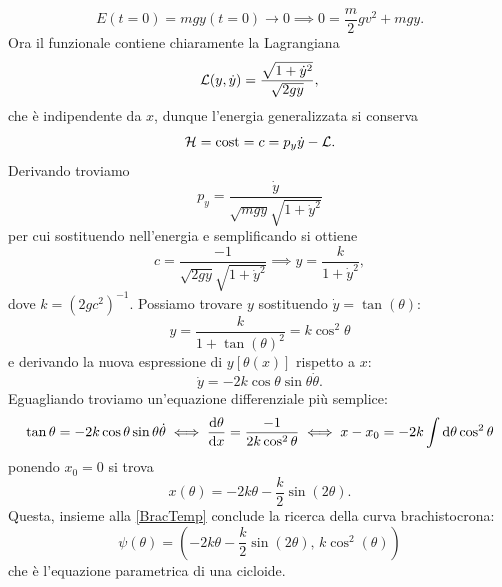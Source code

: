     \begin{equation}
        E(t=0)=mgy(t=0)\to0\implies 0=\frac{m}{2}gv^2+mgy.
    \end{equation}
    Ora il funzionale contiene chiaramente la Lagrangiana
    \begin{equation}
        \mathcal{L}(y,\dot{y}) =\frac{\sqrt{1+\dot{y}^2}}{\sqrt{2gy}} ,
    \end{equation}
    che è indipendente da $x$, dunque l'energia generalizzata si conserva
    \begin{equation}
        \mathcal{H} = \mathrm{cost}=c = p_y\dot{y} - \mathcal{L}. 
    \end{equation}
    Derivando troviamo
    \begin{equation}
        p_y = \frac{\dot{y}}{\sqrt{mgy}{\sqrt{1+\dot{y}^2}}}
    \end{equation}
    per cui sostituendo nell'energia e semplificando si ottiene
    \begin{equation}
        c = \frac{-1}{\sqrt{2gy}\sqrt{1+\dot{y}^2}} \implies y = \frac{k}{1+\dot{y}^2},
    \end{equation}
    dove $k=(2gc^2)^{-1}$. Possiamo trovare $y$ sostituendo $\dot{y}=\tan(\theta)$:
    \begin{equation}
        y = \frac{k}{1+\tan(\theta)^2} = k\cos^2\theta
        \label{BracTemp}
    \end{equation}
    e derivando la nuova espressione di $y[\theta(x)]$ rispetto a $x$:
    \begin{equation}
        \dot{y}=-2k\cos\theta\sin\theta \dot{\theta}.
    \end{equation}
    Eguagliando troviamo un'equazione differenziale più semplice:
    \begin{equation}
        \tan\theta = -2k\cos\theta\sin\theta \dot{\theta} \iff \frac{\mathrm{d} \theta}{\mathrm{d} x} = \frac{-1}{2k\cos^2\theta} \iff x-x_0 = -2k\int \mathrm{d} \theta \cos^2\theta 
    \end{equation}
    ponendo $x_0=0$ si trova 
    \begin{equation}
        x(\theta) = -2k\theta -\frac{k}{2}\sin(2\theta).
    \end{equation}
    Questa, insieme alla \ref{BracTemp} conclude la ricerca della curva brachistocrona:
    \begin{equation}
        \psi(\theta) = \left(-2k\theta -\frac{k}{2}\sin(2\theta),\,k\cos^2(\theta)\right)
    \end{equation}
    che è l'equazione parametrica di una cicloide.

